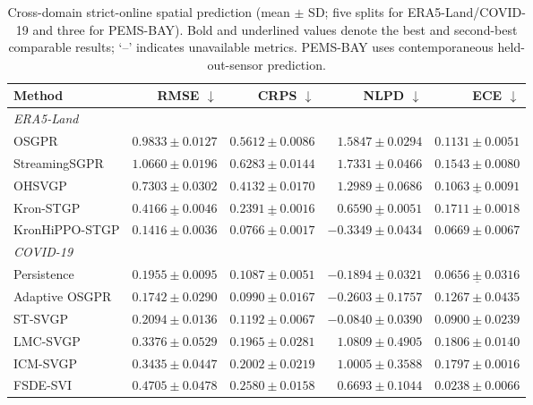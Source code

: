 \documentclass[twoside]{article}
\newcommand{\method}{KronHiPPO-STGP\xspace}
\begin{document}
\begin{table}[t]
\centering
\caption{Cross-domain strict-online spatial prediction (mean $\pm$ SD; five splits for ERA5-Land/COVID-19 and three for PEMS-BAY). Bold and underlined values denote the best and second-best comparable results; `--' indicates unavailable metrics. PEMS-BAY uses contemporaneous held-out-sensor prediction.}
\label{tab:cross-domain}
\small
\setlength{\tabcolsep}{4.5pt}
\setlength{\cmidrulewidth}{0.25pt}
\setlength{\cmidrulekern}{0.8em}
\begin{tabular}{lrrrr}
\toprule
Method & RMSE $\downarrow$ & CRPS $\downarrow$ & NLPD $\downarrow$ & ECE $\downarrow$ \\
\midrule
\multicolumn{5}{l}{\textit{ERA5-Land}} \\
OSGPR~\citep{Bui2017} & $0.9833{\pm}0.0127$ & $0.5612{\pm}0.0086$ & $1.5847{\pm}0.0294$ & $0.1131{\pm}0.0051$ \\
StreamingSGPR~\citep{Maddox2021} & $1.0660{\pm}0.0196$ & $0.6283{\pm}0.0144$ & $1.7331{\pm}0.0466$ & $0.1543{\pm}0.0080$ \\
OHSVGP~\citep{Chen2025} & $0.7303{\pm}0.0302$ & $0.4132{\pm}0.0170$ & $1.2989{\pm}0.0686$ & $\underline{0.1063{\pm}0.0091}$ \\
\addlinespace[2pt]\cmidrule(lr){1-5}\addlinespace[0.5pt]
Kron-STGP & $\underline{0.4166{\pm}0.0046}$ & $\underline{0.2391{\pm}0.0016}$ & $\underline{0.6590{\pm}0.0051}$ & $0.1711{\pm}0.0018$ \\
\method & $\mathbf{0.1416{\pm}0.0036}$ & $\mathbf{0.0766{\pm}0.0017}$ & $\mathbf{-0.3349{\pm}0.0434}$ & $\mathbf{0.0669{\pm}0.0067}$ \\
\midrule
\multicolumn{5}{l}{\textit{COVID-19}} \\
Persistence & $0.1955{\pm}0.0095$ & $0.1087{\pm}0.0051$ & $-0.1894{\pm}0.0321$ & $\underline{0.0656{\pm}0.0316}$ \\
Adaptive OSGPR~\citep{Bui2017} & $0.1742{\pm}0.0290$ & $0.0990{\pm}0.0167$ & $-0.2603{\pm}0.1757$ & $0.1267{\pm}0.0435$ \\
ST-SVGP~\citep{Hamelijnck2021} & $0.2094{\pm}0.0136$ & $0.1192{\pm}0.0067$ & $-0.0840{\pm}0.0390$ & $0.0900{\pm}0.0239$ \\
LMC-SVGP~\citep{Jeong2023} & $0.3376{\pm}0.0529$ & $0.1965{\pm}0.0281$ & $1.0809{\pm}0.4905$ & $0.1806{\pm}0.0140$ \\
ICM-SVGP~\citep{Jeong2023} & $0.3435{\pm}0.0447$ & $0.2002{\pm}0.0219$ & $1.0005{\pm}0.3588$ & $0.1797{\pm}0.0016$ \\
FSDE-SVI~\citep{Jeong2023} & $0.4705{\pm}0.0478$ & $0.2580{\pm}0.0158$ & $0.6693{\pm}0.1044$ & $\mathbf{0.0238{\pm}0.0066}$ \\

\end{tabular}
\end{table}
\end{document}
